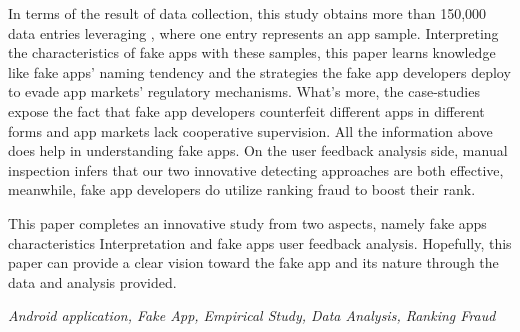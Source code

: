 In terms of the result of data collection, this study obtains more than 150,000 data entries leveraging \mytool, where one entry represents an app sample.
Interpreting the characteristics of fake apps with these samples, this paper learns knowledge like fake apps' naming tendency and the strategies the fake app developers deploy to evade app markets' regulatory mechanisms.
What's more, the case-studies expose the fact that fake app developers counterfeit different apps in different forms and app markets lack cooperative supervision.
All the information above does help in understanding fake apps.
On the user feedback analysis side, manual inspection infers that our two innovative detecting approaches are both effective, meanwhile, fake app developers do utilize ranking fraud to boost their rank.

This paper completes an innovative study from two aspects, namely fake apps characteristics Interpretation and fake apps user feedback analysis.
Hopefully, this paper can provide a clear vision toward the fake app and its nature through the data and analysis provided.

{} \textit{Android application, Fake App, Empirical Study, Data Analysis, Ranking Fraud}
